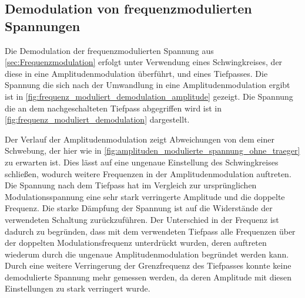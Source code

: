\subsection{Demodulation von frequenzmodulierten Spannungen}

Die Demodulation der frequenzmodulierten Spannung aus \cref{sec:Frequenzmodulation} erfolgt
unter Verwendung eines Schwingkreises, der diese in eine Amplitudenmodulation überführt, und eines
Tiefpasses. Die Spannung die sich nach der Umwandlung in eine Amplitudenmodulation ergibt ist in 
\cref{fig:frequenz_moduliert_demodulation_amplitude} gezeigt. Die Spannung die an dem nachgeschalteten 
Tiefpass abgegriffen wird ist in \cref{fig:frequenz_moduliert_demodulation} dargestellt.





Der Verlauf der Amplitudenmodulation zeigt Abweichungen von dem einer Schwebung, der hier 
wie in \cref{fig:amplituden_modulierte_spannung_ohne_traeger} zu erwarten ist. Dies lässt auf eine ungenaue 
Einstellung des Schwingkreises schließen, wodurch weitere Frequenzen in der Amplitudenmodulation auftreten.
Die Spannung nach dem Tiefpass hat im Vergleich zur ursprünglichen Modulationsspannung eine sehr stark verringerte
Amplitude und die doppelte Frequenz. Die starke Dämpfung der Spannung ist auf die Widerstände der verwendeten 
Schaltung zurückzuführen. Der Unterschied in der Frequenz ist dadurch zu begründen, dass mit dem verwendeten 
Tiefpass alle Frequenzen über der doppelten Modulationsfrequenz unterdrückt wurden, deren auftreten wiederum durch 
die ungenaue Amplitudenmodulation begründet werden kann. Durch eine weitere Verringerung der Grenzfrequenz des
Tiefpasses konnte keine demodulierte Spannung mehr gemessen werden, da deren Amplitude mit diesen Einstellungen 
zu stark verringert wurde.